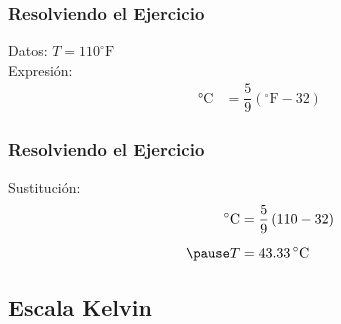 \documentclass[14pt]{beamer}
\begin{document}
\begin{frame}
\frametitle{Resolviendo el Ejercicio}
Datos: $T = 110 ^{\circ} \text{F}$
\\
\bigskip
\pause
Expresión:
\pause
\begin{align*}
\unit{\degreeCelsius} &= \dfrac{5}{9} \left( ^{\circ}\text{F} - 32 \right)
\end{align*}
\end{frame}
\begin{frame}
\frametitle{Resolviendo el Ejercicio}
Sustitución:
\pause
\begin{eqnarray*}
\begin{aligned}
\unit{\degreeCelsius} &= \dfrac{5}{9} \left( 110 - 32 \right) \\[0.5em] \pause
T &= \SI{43.33}{\degreeCelsius}
\end{aligned}
\end{eqnarray*}
\end{frame}

\subsection{Escala Kelvin}
\end{document}
